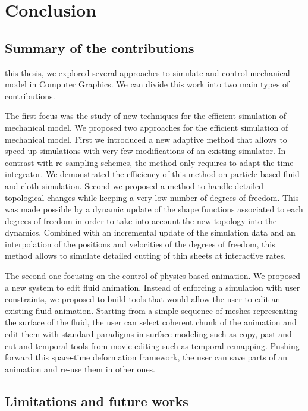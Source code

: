 \chapter{Conclusion}
\label{chap:conclusion}

\section{Summary of the contributions}
 this thesis, we explored several approaches to simulate and control mechanical model in Computer Graphics. We can divide this work into two main types of contributions.

The first focus was the study of new techniques for the efficient simulation of mechanical model. We proposed two approaches for the efficient simulation of mechanical model. First we introduced a new adaptive method that allows to speed-up simulations with very few modifications of an existing simulator. In contrast with re-sampling schemes, the method only requires to adapt the time integrator. We demonstrated the efficiency of this method on particle-based fluid and cloth simulation. Second we proposed a method to handle detailed topological changes while keeping a very low number of degrees of freedom. This was made possible by a dynamic update of the shape functions associated to each degrees of freedom in order to take into account the new topology into the dynamics. Combined with an incremental update of the simulation data and an interpolation of the positions and velocities of the degrees of freedom, this method allows to simulate detailed cutting of thin sheets at interactive rates.

The second one focusing on the control of physics-based animation. We proposed a new system to edit fluid animation. Instead of enforcing a simulation with user constraints, we proposed to build tools that would allow the user to edit an existing fluid animation. Starting from a simple sequence of meshes representing the surface of the fluid, the user can select coherent chunk of the animation and edit them with standard paradigms in surface modeling such as copy, past and cut and temporal tools from movie editing such as temporal remapping. Pushing forward this space-time deformation framework, the user can save parts of an animation and re-use them in other ones.

\section{Limitations and future works}

